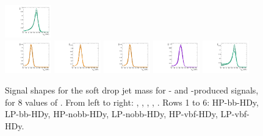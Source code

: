 \begin{figure}[htbp]
  \includegraphics[width=0.18\textwidth]{fig/analysisAppendix/templateSignalVsMX_fromDC_WprToWH_MJJ_mu_HP_vbf_HDy.pdf}\\
  \includegraphics[width=0.18\textwidth]{fig/analysisAppendix/templateSignalVsMX_fromDC_GbuToWW_MJJ_mu_LP_vbf_HDy.pdf}
  \includegraphics[width=0.18\textwidth]{fig/analysisAppendix/templateSignalVsMX_fromDC_RadToWW_MJJ_mu_LP_vbf_HDy.pdf}
  \includegraphics[width=0.18\textwidth]{fig/analysisAppendix/templateSignalVsMX_fromDC_ZprToWW_MJJ_mu_LP_vbf_HDy.pdf}
  \includegraphics[width=0.18\textwidth]{fig/analysisAppendix/templateSignalVsMX_fromDC_WprToWZ_MJJ_mu_LP_vbf_HDy.pdf}
  \includegraphics[width=0.18\textwidth]{fig/analysisAppendix/templateSignalVsMX_fromDC_WprToWH_MJJ_mu_LP_vbf_HDy.pdf}\\
  \caption{
    Signal shapes for the soft drop jet mass \MJ for \ggF- and \DY-produced signals, for 8 values of \MX.
    From left to right: \GBulktoWW, \RadtoWW, \ZprtoWW, \WprtoWZ, \WprtoWH.
    Rows 1 to 6: HP-bb-HDy, LP-bb-HDy, HP-nobb-HDy, LP-nobb-HDy, HP-vbf-HDy, LP-vbf-HDy.
  }
  \label{fig:MJJShapes_NonVBF_HDy}
\end{figure}

